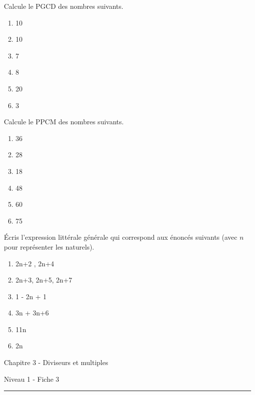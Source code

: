 \documentclass[12pt,parskip=half-, twoside=semi]{scrartcl}
\begin{document}
    \begin{exercise}
      Calcule le PGCD des nombres suivants.
        \begin{enumerate}[cols=3]
            \item 10
            \item 10
            \item 7
            \item 8
            \item 20
            \item 3
        \end{enumerate}
    \end{exercise}
    
    \begin{exercise}
      Calcule le PPCM des nombres suivants.
        \begin{enumerate}[cols=3]
            \item 36
            \item 28
            \item 18
            \item 48
            \item 60
            \item 75
        \end{enumerate}
    \end{exercise}
    
    \begin{exercise}
        Écris l'expression littérale générale qui correspond aux énoncés suivants (avec \(n\) pour représenter les naturels).
        \begin{enumerate}[cols=2]
            \item 2n+2 , 2n+4
            \item 2n+3, 2n+5, 2n+7
            \item 1 - 2n + 1
            \item 3n + 3n+6
            \item 11n
            \item 2n 
        \end{enumerate}
      \end{exercise}

\newpage

\begin{center}
  \bfseries
  \begin{Huge}
    Chapitre 3 - Diviseurs et multiples
  \end{Huge}
  \smallbreak
  \begin{large}
    Niveau 1  - Fiche 3
  \end{large}
  \smallbreak
  \rule[10pt]{.5\linewidth}{1 pt}
\end{center}
\end{document}
